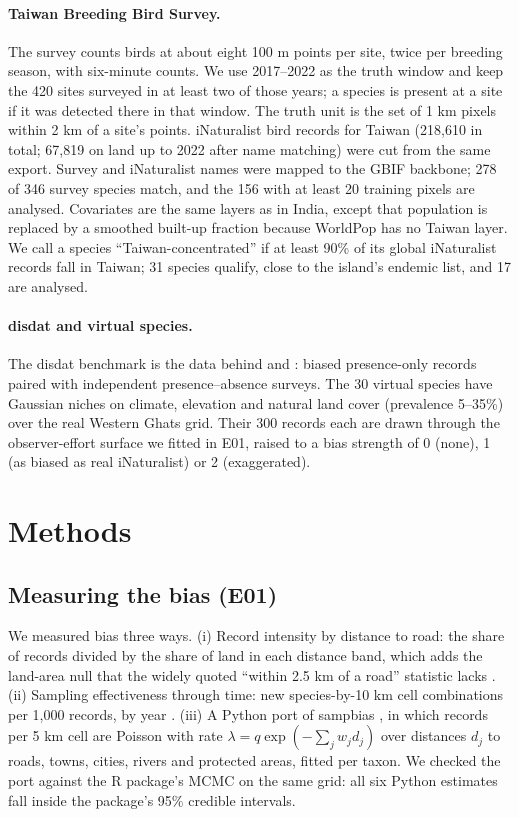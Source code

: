 \documentclass[11pt]{article}
\begin{document}
\paragraph{Taiwan Breeding Bird Survey.} The survey \citep{twbbs} counts birds at about eight 100 m points per site, twice per breeding season, with six-minute counts. We use 2017--2022 as the truth window and keep the 420 sites surveyed in at least two of those years; a species is present at a site if it was detected there in that window. The truth unit is the set of 1 km pixels within 2 km of a site's points. iNaturalist bird records for Taiwan (218,610 in total; 67,819 on land up to 2022 after name matching) were cut from the same export. Survey and iNaturalist names were mapped to the GBIF backbone; 278 of 346 survey species match, and the 156 with at least 20 training pixels are analysed. Covariates are the same layers as in India, except that population is replaced by a smoothed built-up fraction because WorldPop has no Taiwan layer. We call a species ``Taiwan-concentrated'' if at least 90\% of its global iNaturalist records fall in Taiwan; 31 species qualify, close to the island's endemic list, and 17 are analysed.

\paragraph{disdat and virtual species.} The disdat benchmark \citep{elith2020} is the data behind \citet{elith2006} and \citet{phillips2009}: biased presence-only records paired with independent presence--absence surveys. The 30 virtual species have Gaussian niches on climate, elevation and natural land cover (prevalence 5--35\%) over the real Western Ghats grid. Their 300 records each are drawn through the observer-effort surface we fitted in E01, raised to a bias strength of 0 (none), 1 (as biased as real iNaturalist) or 2 (exaggerated).

\section{Methods}
\label{sec:methods}

\subsection{Measuring the bias (E01)}
We measured bias three ways. (i) Record intensity by distance to road: the share of records divided by the share of land in each distance band, which adds the land-area null that the widely quoted ``within 2.5 km of a road'' statistic lacks \citep{hughes2021}. (ii) Sampling effectiveness through time: new species-by-10 km cell combinations per 1,000 records, by year \citep{oliver2021}. (iii) A Python port of sampbias \citep{zizka2021}, in which records per 5 km cell are Poisson with rate $\lambda = q \exp(-\sum_j w_j d_j)$ over distances $d_j$ to roads, towns, cities, rivers and protected areas, fitted per taxon. We checked the port against the R package's MCMC on the same grid: all six Python estimates fall inside the package's 95\% credible intervals.
\end{document}
